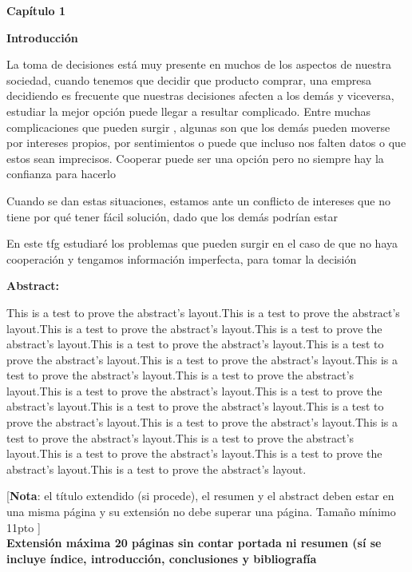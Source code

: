 \documentclass[11pt, a4paper]{article} %
\begin{document}
\newpage

{\bfseries \large Capítulo 1 }\vspace{5mm} 

{\bfseries \large Introducción} \vspace{15mm}

La toma de decisiones está muy presente en muchos de los aspectos de nuestra sociedad, cuando tenemos que decidir que producto comprar, una empresa decidiendo 
es frecuente que  nuestras decisiones afecten a los demás y viceversa, estudiar la mejor opción puede llegar a resultar complicado. Entre muchas complicaciones que pueden surgir , algunas son que los demás pueden moverse por intereses propios, por sentimientos o puede que incluso nos falten datos o que estos sean imprecisos. Cooperar puede ser una opción pero no siempre hay la confianza para hacerlo





Cuando se dan estas situaciones, estamos ante un conflicto de intereses que no tiene por qué tener fácil solución, dado que los demás podrían estar 








En este tfg estudiaré los problemas que pueden surgir en el caso de que no haya cooperación y tengamos información imperfecta, para tomar la decisión 





\vspace{1cm}

{\bfseries \large Abstract: }\vspace{5mm} 

This is a test to prove the abstract's layout.This is a test to prove the abstract's layout.This is a test to prove the abstract's layout.This is a test to prove the abstract's layout.This is a test to prove the abstract's layout.This is a test to prove the abstract's layout.This is a test to prove the abstract's layout.This is a test to prove the abstract's layout.This is a test to prove the abstract's layout.This is a test to prove the abstract's layout.This is a test to prove the abstract's layout.This is a test to prove the abstract's layout.This is a test to prove the abstract's layout.This is a test to prove the abstract's layout.This is a test to prove the abstract's layout.This is a test to prove the abstract's layout.This is a test to prove the abstract's layout.This is a test to prove the abstract's layout.This is a test to prove the abstract's layout.
\vspace{1cm}

[\Large\textbf{Nota}: el título extendido (si procede), el resumen y el abstract deben estar en una misma página y su extensión no debe superar una página. Tamaño mínimo 11pto ]\\

{\Large\textbf{Extensión máxima 20 páginas sin contar portada ni resumen (sí se incluye índice, introducción, conclusiones y bibliografía}}
\newpage

\end{document}

